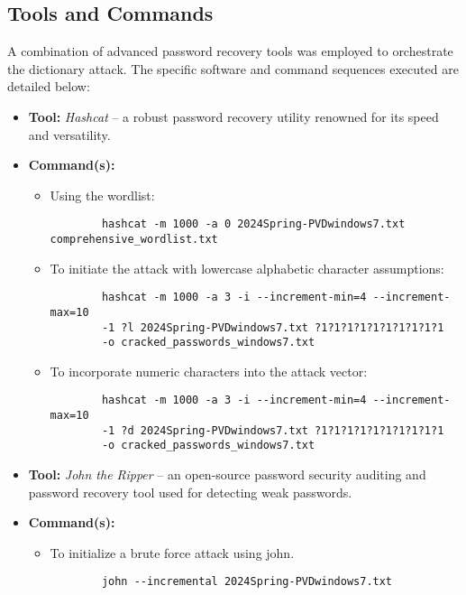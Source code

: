 \documentclass{article}
\begin{document}
\subsection{Tools and Commands}
A combination of advanced password recovery tools was employed to orchestrate the dictionary attack. The specific software and command sequences executed are detailed below:

\begin{itemize}
    \item \textbf{Tool:} \textit{Hashcat} -- a robust password recovery utility renowned for its speed and versatility.
    \item \textbf{Command(s):} 
    \begin{itemize}
        \item Using the wordlist:
        \begin{verbatim}
        hashcat -m 1000 -a 0 2024Spring-PVDwindows7.txt comprehensive_wordlist.txt
        \end{verbatim}
        \item To initiate the attack with lowercase alphabetic character assumptions:
        \begin{verbatim}
        hashcat -m 1000 -a 3 -i --increment-min=4 --increment-max=10
        -1 ?l 2024Spring-PVDwindows7.txt ?1?1?1?1?1?1?1?1?1?1
        -o cracked_passwords_windows7.txt
        \end{verbatim}
        \item To incorporate numeric characters into the attack vector:
        \begin{verbatim}
        hashcat -m 1000 -a 3 -i --increment-min=4 --increment-max=10
        -1 ?d 2024Spring-PVDwindows7.txt ?1?1?1?1?1?1?1?1?1?1
        -o cracked_passwords_windows7.txt
        \end{verbatim}
    \end{itemize}
    \item \textbf{Tool:} \textit{John the Ripper} -- an open-source password security auditing and password recovery tool used for detecting weak passwords.
    \item \textbf{Command(s):} 
    \begin{itemize}
        \item To initialize a brute force attack using john.
        \begin{verbatim}
        john --incremental 2024Spring-PVDwindows7.txt
        \end{verbatim}
    \end{itemize}
\end{itemize}
\end{document}
